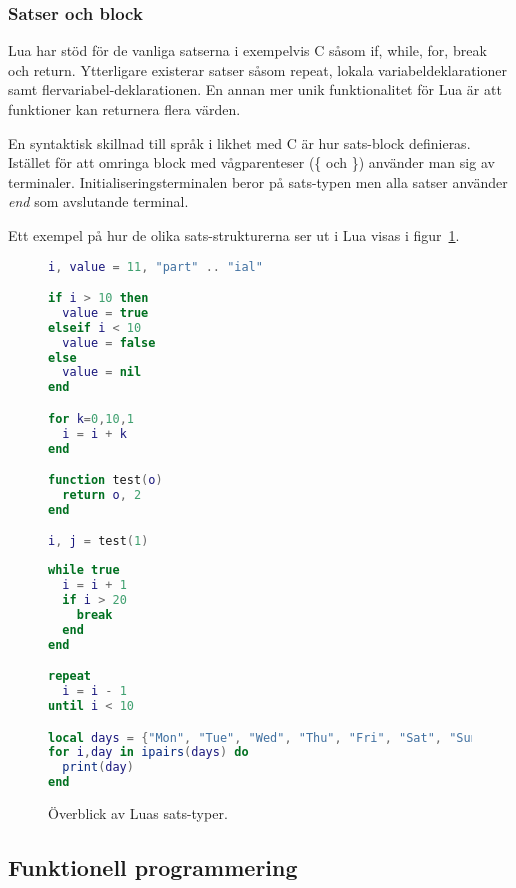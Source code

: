 \subsubsection{Satser och block}

Lua har stöd för de vanliga satserna i exempelvis C såsom if, while, for,
break och return. Ytterligare existerar satser såsom repeat, lokala
variabeldeklarationer samt flervariabel-deklarationen. En annan mer unik
funktionalitet för Lua är att funktioner kan returnera flera värden.

En syntaktisk skillnad till språk i likhet med C är hur sats-block definieras.
Istället för att omringa block med vågparenteser (\{ och \}) använder man sig
av terminaler. Initialiseringsterminalen beror på sats-typen men alla satser
använder \textit{end} som avslutande terminal.

Ett exempel på hur de olika sats-strukturerna ser ut i Lua visas i
figur~\ref{fig:luacode}.

\begin{figure}[ht]
  \begin{minipage}[t]{0.5\textwidth}
\begin{lstlisting}[language=Lua]
i, value = 11, "part" .. "ial"

if i > 10 then
  value = true
elseif i < 10
  value = false
else
  value = nil
end

for k=0,10,1
  i = i + k
end

function test(o)
  return o, 2
end

i, j = test(1)
\end{lstlisting}
  \end{minipage}
  \begin{minipage}[t]{0.5\textwidth}
\begin{lstlisting}[language=Lua]
while true
  i = i + 1
  if i > 20
    break
  end
end

repeat
  i = i - 1
until i < 10

local days = {"Mon", "Tue", "Wed", "Thu", "Fri", "Sat", "Sun"}
for i,day in ipairs(days) do
  print(day)
end
\end{lstlisting}
  \end{minipage}
  \caption{Överblick av Luas sats-typer.}
  \label{fig:luacode}
\end{figure}

\subsection{Funktionell programmering}

